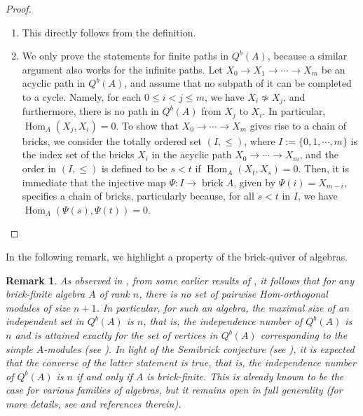 \documentclass{amsart}
\theoremstyle{thmstyle}
\theoremstyle{exstyle}
\theoremstyle{defstyle}
\theoremstyle{remstyle}
\newtheorem{remark}[thm]{Remark}
\theoremstyle{remstyle}
\newcommand{\Hom}{\operatorname{Hom}}
\DeclareMathOperator*{\brick}{brick}
\begin{document}
\begin{proof}
\begin{enumerate}
    \item This directly follows from the definition.

    \item We only prove the statements for finite paths in $Q^b(A)$, because a similar argument also works for the infinite paths. 
    Let $X_0 \to X_1 \to \cdots \to X_m$ be an acyclic path in $Q^b(A)$, and assume that no subpath of it can be completed to a cycle. Namely, for each $0 \leq i < j \leq m$, we have $X_i \not\simeq X_j$, and furthermore, there is no path in $Q^b(A)$ from $X_j$ to $X_i$. In particular, $\Hom_A(X_j,X_i)=0$. To show that $X_0 \to \cdots \to X_m$  gives rise to a chain of bricks, we consider the totally ordered set $(I,\leq)$, where $I:=\{0,1, \cdots,m\}$ is the index set of the bricks $X_i$ in the acyclic path $X_0 \to \cdots \to X_m$, and the order in $(I,\leq)$ is defined to be $s < t$ if $\Hom_A(X_t,X_s)=0$. 
    Then, it is immediate that the injective map $\Psi: I \rightarrow \brick A$, given by $\Psi(i)=X_{m-i}$, specifies a chain of bricks, particularly because, for all $s < t$ in $I$, we have $\Hom_A(\Psi(s),\Psi(t))=0$.
\end{enumerate}
\end{proof}

In the following remark, we highlight a property of the brick-quiver of algebras. 

\begin{remark}
As observed in \cite{MP2}, from some earlier results of \cite{As}, it follows that for any brick-finite algebra $A$ of rank $n$, there is no set of pairwise Hom-orthogonal modules of size $n+1$. In particular, for such an algebra, the maximal size of an independent set in $Q^b(A)$ is $n$, that is, the independence number of $Q^b(A)$ is $n$ and is attained exactly for the set of vertices in $Q^b(A)$ corresponding to the simple $A$-modules (see \cite[Theorem A]{MP2}). In light of the Semibrick conjecture (see \cite[Conjecture 2.2]{MP2}), it is expected that the converse of the latter statement is true, that is, the independence number of $Q^b(A)$ is $n$ if and only if $A$ is brick-finite. This is already known to be the case for various families of algebras, but it remains open in full generality (for more details, see \cite{MP2, MP4} and references therein).
\end{remark}
\end{document}
